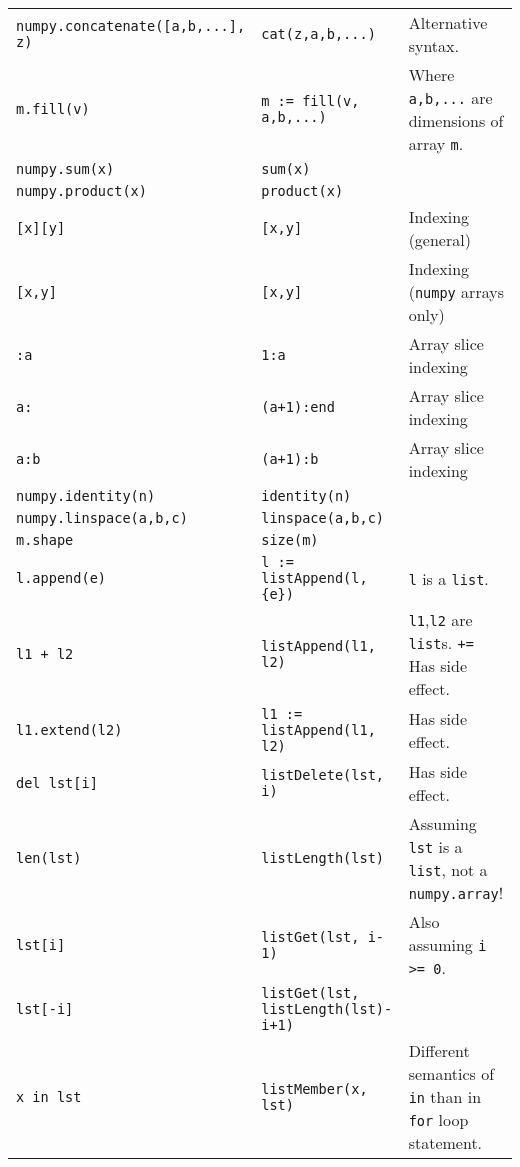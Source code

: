\documentclass[a4paper,10pt]{article}
\begin{document}
\begin{tabularx}{\textwidth}{|l|l|p{5cm}|}
\tt numpy.concatenate([a,b,...], z) & \tt cat(z,a,b,...) & Alternative syntax. \\
\tt m.fill(v) & \tt m := fill(v, a,b,...) & Where {\tt a,b,...} are dimensions of array {\tt m}. \\
\tt numpy.sum(x) & \tt sum(x) & \\
\tt numpy.product(x) & \tt product(x) & \\
\tt [x][y] & \tt [x,y] & Indexing (general) \\
\tt [x,y] & \tt [x,y] & Indexing ({\tt numpy} arrays only) \\
\tt :a & \tt 1:a & Array slice indexing \\
\tt a: & \tt (a+1):end & Array slice indexing \\
\tt a:b & \tt (a+1):b & Array slice indexing \\
\tt numpy.identity(n) & \tt identity(n) & \\
\tt numpy.linspace(a,b,c) & \tt linspace(a,b,c) & \\
\tt m.shape & \tt size(m) & \\
\tt l.append(e) & \tt l := listAppend(l, \{e\}) & {\tt l} is a {\tt list}. \\
\tt l1 + l2 & \tt listAppend(l1, l2) & {\tt l1},{\tt l2} are {\tt list}s. {\tt +=} Has side effect. \\ 
\tt l1.extend(l2) & \tt l1 := listAppend(l1, l2) & Has side effect. \\ 

\tt del lst[i] & \tt listDelete(lst, i) & Has side effect. \\
\tt len(lst) & \tt listLength(lst) & Assuming {\tt lst} is a {\tt list}, not a {\tt numpy.array}! \\
\tt lst[i] & \tt listGet(lst, i-1) & Also assuming {\tt i >= 0}. \\
\tt lst[-i] & \tt listGet(lst, listLength(lst)-i+1) & \\
\tt x in lst & \tt listMember(x, lst) & Different semantics of {\tt in} than in {\tt for} loop statement. \\
\hline
\end{tabularx}
\end{document}
